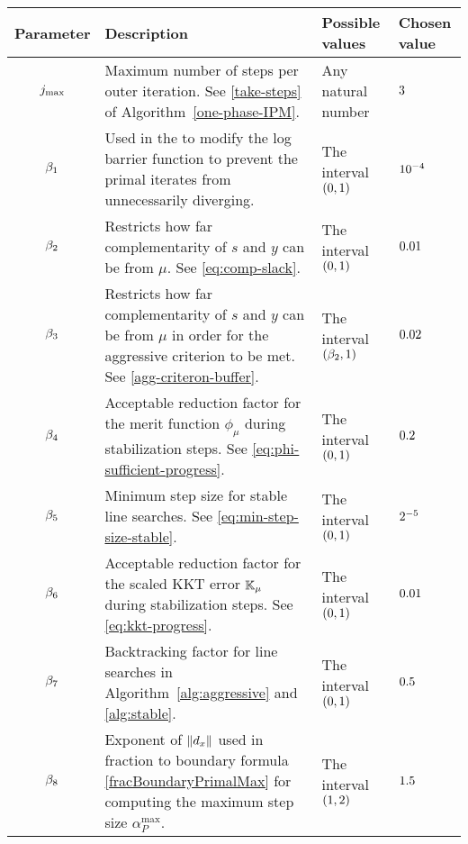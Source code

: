 \documentclass{article}
\begin{document}
\begin{table}[H]
\begin{tabular}{ |c| p{7cm}|p{4.0cm}| p{3cm}| } 
 \hline
Parameter & Description & Possible values & Chosen value  \\ 
 \hline
$j_{\max}$ & Maximum number of steps per outer iteration. See \eqref{take-steps} of Algorithm~\ref{one-phase-IPM}.  & Any natural number & $3$  \\ 
\hline
$\beta_{1}$ & Used in the to modify the log barrier function to prevent the primal iterates from unnecessarily diverging. & The interval $(0,1)$ & $10^{-4}$ \\
\hline
  $\beta_{2}$ & Restricts how far complementarity of $s$ and $y$ can be from $\mu$. See \eqref{eq:comp-slack}.  & The interval $(0,1)$ & $0.01$ \\ 
 \hline
   $\beta_{3}$ & Restricts how far complementarity of $s$ and $y$ can be from $\mu$ in order for the aggressive criterion to be met. See \eqref{agg-criteron-buffer}.  & The interval  $(\beta_{2},1)$ & $0.02$  \\ 
    \hline
            $\beta_{4}$ & Acceptable reduction factor for the merit function $\phi_{\mu}$ during stabilization steps. See \eqref{eq:phi-sufficient-progress}.  & The interval $(0,1)$ & $0.2$  \\
    \hline
   $\beta_{5}$ & Minimum step size for stable line searches. See \eqref{eq:min-step-size-stable}.  & The interval $(0,1)$ & $2^{-5}$  \\ 
   \hline 
      $\beta_{6}$ & Acceptable reduction factor for the scaled KKT error $\mathbb{K}_{\mu}$ during stabilization steps. See \eqref{eq:kkt-progress}.  & The interval $(0,1)$ & $0.01$ \\ 
      \hline
    $\beta_{7}$ & Backtracking factor for line searches in Algorithm~\ref{alg:aggressive} and \ref{alg:stable}. & The interval $(0,1)$ & $0.5$ \\
    \hline
$\beta_{8}$ & Exponent of $\| d_{x} \|$ used in fraction to boundary formula \eqref{fracBoundaryPrimalMax} for computing the maximum step size $\alpha_{P}^{\max}$. & The interval $(1,2)$ & $1.5$ \\

\end{tabular}
\end{table}
\end{document}

